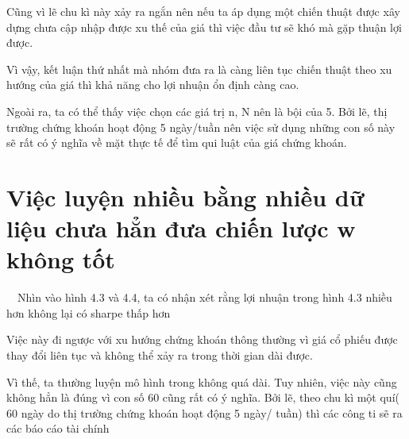 \documentclass[14pt]{extreport}
\begin{document}
\newpage

Cũng vì lẽ chu kì này xảy ra ngắn nên nếu ta áp dụng một chiến thuật được xây dựng chưa cập nhập được xu thế của giá thì việc đầu tư sẽ khó mà gặp thuận lợi được.

Vì vậy, kết luận thứ nhất mà nhóm đưa ra là càng liên tục chiến thuật theo xu hướng của giá thì khả năng cho lợi nhuận ổn định càng cao.

Ngoài ra, ta có thể thấy việc chọn các giá trị n, N nên là bội của 5. Bởi lẽ, thị trường chứng khoán hoạt động 5 ngày/tuần nên việc sử dụng những con số này sẽ rất có ý nghĩa về mặt thực tế để tìm qui luật của giá chứng khoán.

\newpage

\section{Việc luyện nhiều bằng nhiều dữ liệu chưa hẳn đưa chiến lược w không tốt}

$\quad$Nhìn vào hình 4.3 và 4.4, ta có nhận xét rằng lợi nhuận trong hình 4.3 nhiều hơn không lại có sharpe thấp hơn

Việc này đi ngược với xu hướng chứng khoán thông thường vì giá cổ phiếu được thay đổi liên tục và không thể xảy ra trong thời gian dài được. 

Vì thế, ta thường luyện mô hình trong không quá dài. Tuy nhiên, việc này cũng không hẳn là đúng vì con số 60 cũng rất có ý nghĩa. Bởi lẽ, theo chu kì một quí( 60 ngày do thị trường chứng khoán hoạt động 5 ngày/ tuần) thì các công ti sẽ ra các báo cáo tài chính
\end{document}
